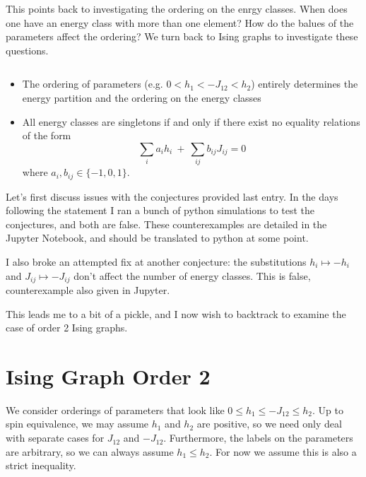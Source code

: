 This points back to investigating the ordering on the enrgy classes. When does one have an energy class with more than one element? How do the balues of the parameters affect the ordering? We turn back to Ising graphs to investigate these questions.

\begin{conjecture}\label{conjecture:ising-graph-conj-1}$ $
	\begin{itemize}
		\item The ordering of parameters (e.g. $0 < h_1 < -J_{12} < h_2$) entirely determines the energy partition and the ordering on the energy classes
		\item All energy classes are singletons if and only if there exist no equality relations of the form $$\sum_i a_i h_i ~+~ \sum_{ij} b_{ij} J_{ij} = 0$$ where $a_i,b_{ij} \in \{-1,0,1\}$.
	\end{itemize}
\end{conjecture}
\newpage
{}
Let's first discuss issues with the conjectures provided last entry. In the days following the statement I ran a bunch of python simulations to test the conjectures, and both are false. These counterexamples are detailed in the Jupyter Notebook, and should be translated to python at some point.

I also broke an attempted fix at another conjecture: the substitutions $h_i \mapsto -h_i$ and $J_{ij}\mapsto -J_{ij}$ don't affect the number of energy classes. This is false, counterexample also given in Jupyter.

This leads me to a bit of a pickle, and I now wish to backtrack to examine the case of order 2 Ising graphs.

\section*{Ising Graph Order 2}
We consider orderings of parameters that look like $0 \leq h_1\leq -J_{12} \leq h_2$. Up to spin equivalence, we may assume $h_1$ and $h_2$ are positive, so we need only deal with separate cases for $J_{12}$ and $-J_{12}$. Furthermore, the labels on the parameters are arbitrary, so we can always assume $h_1 \leq h_2$. For now we assume this is also a strict inequality.

